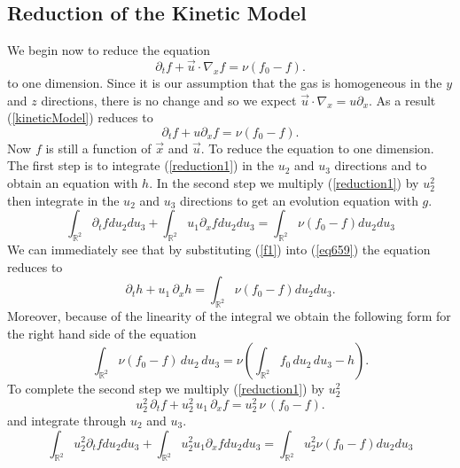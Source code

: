 \subsection{Reduction of the Kinetic Model}
We begin now to reduce the equation
%
\begin{equation}
\label{kineticModel}
\partial_t f + \vec{u} \cdot \nabla_x f = \nu \left( f_0 - f \right).
\end{equation}
%
to one dimension. Since it is our assumption that the gas is homogeneous in the $y$ and $z$ directions, there is no change and so we expect $\vec{u} \cdot \nabla_x = u \partial_x$. As a result (\ref{kineticModel}) reduces to
%
\begin{equation}
\label{reduction1}
\partial_t f + u \partial_x f = \nu \left( f_0 - f \right).
\end{equation}
%
Now $f$ is still a function of $\vec{x}$ and $\vec{u}$. To reduce the equation to one dimension. The first step is to integrate (\ref{reduction1}) in the $u_2$ and $u_3$ directions and to obtain an equation with $h$. In the second step we multiply (\ref{reduction1}) by $u_2^2$ then integrate in the $u_2$ and $u_3$ directions to get an evolution equation with $g$.
%
\begin{equation}
\label{eq659}
\int_{\mathbb{R}^2} \partial_t f du_2 du_3 + \int_{\mathbb{R}^2} u_1 \partial_x f du_2 du_3 = \int_{\mathbb{R}^2} \nu \left( f_0 - f \right) du_2 du_3
\end{equation}
%
We can immediately see that by substituting (\ref{f1}) into (\ref{eq659}) the equation reduces to
%
\begin{equation*}
\partial_t h + u_1 \, \partial_x h = \int_{\mathbb{R}^2} \nu \left( f_0 - f \right) du_2 du_3.
\end{equation*}
%
Moreover, because of the linearity of the integral we obtain the following form for the right hand side of the equation
%
\begin{equation}
\label{f1Part}
\int_{\mathbb{R}^2} \nu \left( f_0 - f \right) \, du_2 \, du_3 = \nu \left( \int_{\mathbb{R}^2} f_0 \, du_2 \, du_3 - h \right).
\end{equation}
%
To complete the second step we multiply (\ref{reduction1}) by $u_2^2$
%
\begin{equation*}
u_2^2 \, \partial_t f + u_2^2 \, u_1 \, \partial_x f = u_2^2 \, \nu \, \left( f_0 - f \right).
\end{equation*}
%
and integrate through $u_2$ and $u_3$.
%
\begin{equation*}
\int_{\mathbb{R}^2} u_2^2 \partial_t f du_2 du_3 + \int_{\mathbb{R}^2} u_2^2 u_1 \partial_x f du_2 du_3 = \int_{\mathbb{R}^2} u_2^2 \nu \left( f_0 - f \right) du_2 du_3
\end{equation*}
